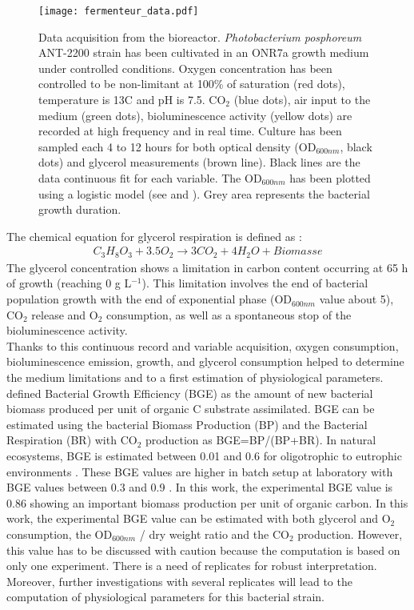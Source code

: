 \begin{figure}[!h]
\linespread{1} 
\centering
\texttt{[image: fermenteur\_data.pdf]}
\caption[Data acquisition from the bioreactor. \textit{Photobacterium posphoreum} ANT-2200 strain has been cultivated in an ONR7a growth medium  under controlled conditions.]{Data acquisition from the bioreactor. \textit{Photobacterium posphoreum} ANT-2200 strain has been cultivated in an ONR7a growth medium  under controlled conditions. Oxygen concentration has been controlled to be non-limitant at 100\% of saturation (red dots), temperature is 13\degres C and pH is 7.5. CO$_2$ (blue dots), air input to the medium (green dots), bioluminescence activity (yellow dots) are recorded at high frequency and in real time. Culture has been sampled each 4 to 12 hours for both optical density (OD$_{600nm}$, black dots) and glycerol measurements (brown line). Black lines are the data continuous fit for each variable. The OD$_{600nm}$ has been plotted using a logistic model (see \citealp{martini2013} and \citealp{verhulst1838}). Grey area represents the bacterial growth duration.}
\label{fermdata}
\end{figure} 
The chemical equation for glycerol respiration is defined as :
\begin{eqnarray}
C_3H_8O_3 + 3.5 O_2 \longrightarrow 3 CO_2 + 4 H_2O + Biomasse
\end{eqnarray}
The glycerol concentration shows a limitation in carbon content occurring at 65 h of growth (reaching 0 g L$^{-1}$). This limitation involves the end of bacterial population growth with the end of exponential phase (OD$_{600nm}$ value about 5), CO$_2$ release and O$_2$ consumption, as well as a spontaneous stop of the bioluminescence activity.\\

Thanks to this continuous record and variable acquisition, oxygen consumption, bioluminescence emission, growth, and glycerol consumption helped to determine the medium limitations and to a first estimation of physiological parameters. \cite{del1998} defined Bacterial Growth Efficiency (BGE) as the amount of new bacterial biomass produced per unit of organic C substrate assimilated. BGE can be estimated using the bacterial Biomass Production (BP) and the Bacterial Respiration (BR) with CO$_2$ production as BGE=BP/(BP+BR). In natural ecosystems, BGE is estimated between 0.01 and 0.6 for oligotrophic to eutrophic environments \citep{del1998}. These BGE values are higher in batch setup at laboratory with BGE values between 0.3 and 0.9 \citep{del1998}. In this work, the experimental BGE value is 0.86 showing an important biomass production per unit of organic carbon. In this work, the experimental BGE value can be estimated with both glycerol and O$_2$ consumption, the OD$_{600nm}$ / dry weight ratio and the CO$_2$ production. However, this value has to be discussed with caution because the computation is based on only one experiment. There is a need of replicates for robust interpretation. Moreover, further investigations with several replicates will lead to the computation of physiological parameters for this bacterial strain.\\

